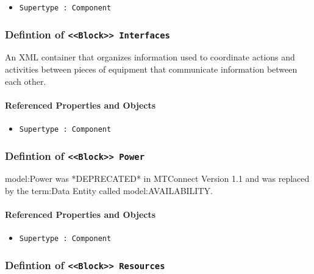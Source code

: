 \begin{itemize}
\item \texttt{Supertype : Component}

\end{itemize}
\FloatBarrier
\subsubsection{Defintion of \texttt{<<Block>> Interfaces}}
  \label{type:Interfaces}

\FloatBarrier

An XML container that organizes information used to coordinate actions and activities between pieces of equipment that communicate information between each other.

\FloatBarrier
\paragraph{Referenced Properties and Objects}

\begin{itemize}
\item \texttt{Supertype : Component}

\end{itemize}
\FloatBarrier
\subsubsection{Defintion of \texttt{<<Block>> Power}}
  \label{type:Power}

\FloatBarrier

{model:Power} was *DEPRECATED* in MTConnect Version 1.1 and was replaced by the {term:Data Entity} called {model:AVAILABILITY}.

\FloatBarrier
\paragraph{Referenced Properties and Objects}

\begin{itemize}
\item \texttt{Supertype : Component}

\end{itemize}
\FloatBarrier
\subsubsection{Defintion of \texttt{<<Block>> Resources}}
  \label{type:Resources}

\FloatBarrier

